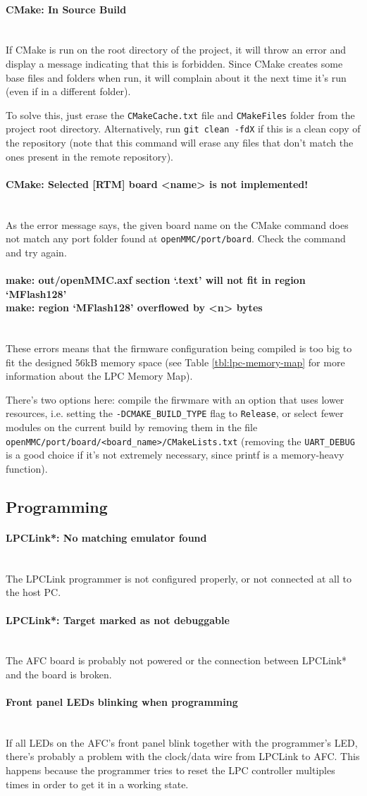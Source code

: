 \documentclass[letterpaper,12pt, titlepage]{article}
\newcommand{\newparagraph}[1]{\paragraph{#1}\mbox{}\\}
\begin{document}
\newparagraph{CMake: In Source Build}
If CMake is run on the root directory of the project, it will throw an error and display a message indicating that this is forbidden. Since CMake creates some base files and folders when run, it will complain about it the next time it's run (even if in a different folder).

To solve this, just erase the \texttt{CMakeCache.txt} file and \texttt{CMakeFiles} folder from the project root directory. Alternatively, run \texttt{git clean -fdX} if this is a clean copy of the repository (note that this command will erase any files that don't match the ones present in the remote repository).

\newparagraph{CMake: Selected [RTM] board <name> is not implemented!}
As the error message says, the given board name on the CMake command does not match any port folder found at \texttt{openMMC/port/board}. Check the command and try again.

\newparagraph{make: out/openMMC.axf section `.text' will not fit in region `MFlash128' \\ make: region `MFlash128' overflowed by <n> bytes}
These errors means that the firmware configuration being compiled is too big to fit the designed 56kB memory space (see Table \ref{tbl:lpc-memory-map} for more information about the LPC Memory Map).

There's two options here: compile the firwmare with an option that uses lower resources, i.e. setting the \texttt{-DCMAKE\_BUILD\_TYPE} flag to \texttt{Release}, or select fewer modules on the current build by removing them in the file \texttt{openMMC/port/board/<board\_name>/CMakeLists.txt} (removing the \texttt{UART\_DEBUG} is a good choice if it's not extremely necessary, since printf is a memory-heavy function).

\subsection{Programming}

\newparagraph{LPCLink*: No matching emulator found}
The LPCLink programmer is not configured properly, or not connected at all to the host PC.

\newparagraph{LPCLink*: Target marked as not debuggable}
The AFC board is probably not powered or the connection between LPCLink* and the board is broken.

\newparagraph{Front panel LEDs blinking when programming}
If all LEDs on the AFC's front panel blink together with the programmer's LED, there's probably a problem with the clock/data wire from LPCLink to AFC. This happens because the programmer tries to reset the LPC controller multiples times in order to get it in a working state.
\end{document}
